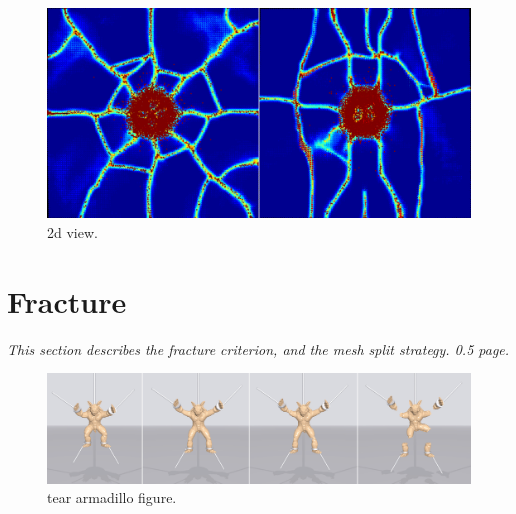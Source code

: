 \begin{figure}[h]
  \centering
  \includegraphics[width=\linewidth, bb=0 0 1400 700]{./figs/demo_impact_color_map.png}
  \caption{\label{fig:5}
  2d view.
}
\end{figure}

\section{Fracture}

\emph{This section describes the fracture criterion, and the mesh split strategy. 0.5 page.}
\begin{figure}[t]
  \centering
  \includegraphics[width=\linewidth]{./figs/demo_tear_armadillo.eps}
  \caption{\label{fig:6}
  tear armadillo figure.
}
\end{figure}

